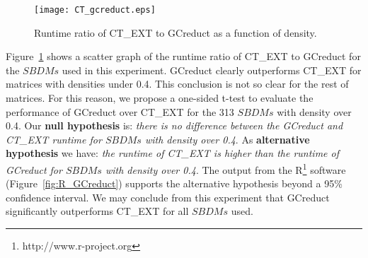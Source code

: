 \documentclass[authoryear,preprint,review,12pt]{elsarticle}
\begin{document}
%	
	\begin{figure}[htb]
	    \begin{center}
	       \texttt{[image: CT\_gcreduct.eps]}
	    \end{center}
	\caption{Runtime ratio of CT\_EXT to GCreduct as a function of density.}
	\label{fig:CTvsGAP}
	\end{figure}		
	
	Figure~\ref{fig:CTvsGAP} shows a scatter graph of the runtime ratio of CT\_EXT to GCreduct for the $SBDMs$ used in	this experiment. GCreduct clearly outperforms CT\_EXT for matrices with densities under 0.4. This conclusion is not so clear for the rest of matrices. For this reason, we propose a one-sided t-test to evaluate the performance of GCreduct over CT\_EXT for the 313 $SBDMs$ with density over 0.4. Our \textbf{null hypothesis} is: \emph{there is no difference between the GCreduct and CT\_EXT runtime for $SBDMs$ with density over 0.4}. As \textbf{alternative hypothesis} we have: \emph{the runtime of CT\_EXT is higher than the runtime of GCreduct for $SBDMs$ with density over 0.4}. The output from the R\footnote{http://www.r-project.org} software (Figure~\ref{fig:R_GCreduct}) supports the alternative hypothesis beyond a 95\% confidence interval. We may conclude from this experiment that GCreduct significantly outperforms CT\_EXT for all $SBDMs$ used.
	
\end{document}
